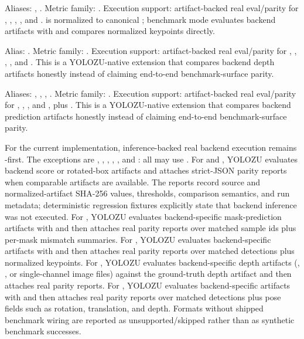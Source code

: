 \begin{description}[leftmargin=2.8cm, style=nextline]
  \item[\cmd{keypoints}]
  Aliases: , . Metric family: .
  Execution support: artifact-backed real eval/parity for ,
  , , , and .  is normalized to
  canonical ; benchmark mode evaluates backend
   artifacts with  and
  compares normalized keypoints directly.

  \item[\cmd{depth}]
  Alias: . Metric family: . Execution support:
  artifact-backed real eval/parity for , , ,
  , and . This is a YOLOZU-native extension that compares backend
  depth artifacts honestly instead of claiming end-to-end benchmark-surface
  parity.

  \item[\cmd{pose6d}]
  Aliases: , , , . Metric
  family: . Execution support: artifact-backed real
  eval/parity for , , , and
  , plus . This is a YOLOZU-native extension that compares backend
  prediction artifacts honestly instead of claiming end-to-end
  benchmark-surface parity.
\end{description}

For the current implementation, inference-backed real backend execution remains
-first. The exceptions are , ,
, , , and : all may
use . For  and
, YOLOZU evaluates backend score or rotated-box artifacts and attaches
strict-JSON parity reports when comparable artifacts are available. The reports
record source and normalized-artifact SHA-256 values, thresholds, comparison
semantics, and run metadata; deterministic regression fixtures explicitly state
that backend inference was not executed. For , YOLOZU evaluates
backend-specific mask-prediction artifacts with 
and then attaches real parity reports over matched sample ids plus per-mask mismatch summaries.
For , YOLOZU evaluates
backend-specific  artifacts with 
and then attaches real parity reports over matched detections plus normalized keypoints.
For , YOLOZU evaluates backend-specific depth artifacts (, , or single-channel
image files) against the ground-truth depth artifact and then attaches real
parity reports. For , YOLOZU evaluates backend-specific
 artifacts with  and then
attaches real parity reports over matched detections plus pose fields such as
rotation, translation, and depth. Formats without shipped benchmark wiring are
reported as unsupported/skipped rather than as synthetic benchmark successes.

